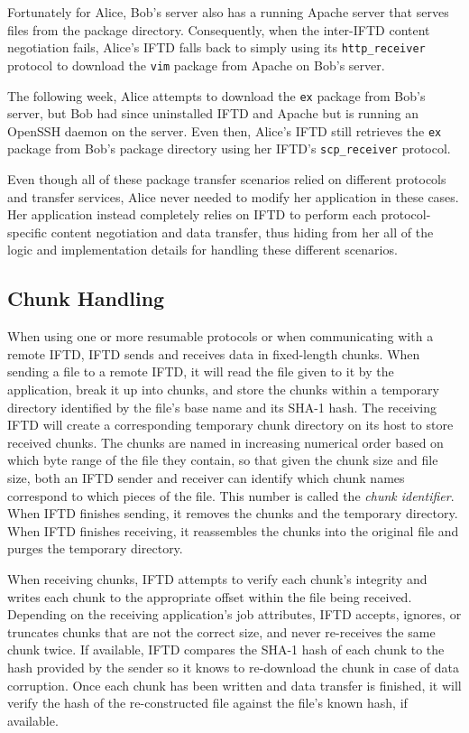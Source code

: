 Fortunately for Alice, Bob's server also has a running Apache server that serves files from the package directory.  Consequently, when the inter-IFTD content negotiation fails, Alice's IFTD falls back to simply using its \texttt{http\_receiver} protocol to download the \texttt{vim} package from Apache on Bob's server.

The following week, Alice attempts to download the \texttt{ex} package from Bob's server, but Bob had since uninstalled IFTD and Apache but is running an OpenSSH daemon on the server.  Even then, Alice's IFTD still retrieves the \texttt{ex} package from Bob's package directory using her IFTD's \texttt{scp\_receiver} protocol.

Even though all of these package transfer scenarios relied on different protocols and transfer services, Alice never needed to modify her application in these cases.  Her application instead completely relies on IFTD to perform each protocol-specific content negotiation and data transfer, thus hiding from her all of the logic and implementation details for handling these different scenarios.

\subsection{Chunk Handling}

When using one or more resumable protocols or when communicating with a remote IFTD, IFTD sends and receives data in fixed-length chunks.  When sending a file to a remote IFTD, it will read the file given to it by the application, break it up into chunks, and store the chunks within a temporary directory identified by the file's base name and its SHA-1 hash.  The receiving IFTD will create a corresponding temporary chunk directory on its host to store received chunks.  The chunks are named in increasing numerical order based on which byte range of the file they contain, so that given the chunk size and file size, both an IFTD sender and receiver can identify which chunk names correspond to which pieces of the file.  This number is called the \textit{chunk identifier}.  When IFTD finishes sending, it removes the chunks and the temporary directory.  When IFTD finishes receiving, it reassembles the chunks into the original file and purges the temporary directory.

When receiving chunks, IFTD attempts to verify each chunk's integrity and writes each chunk to the appropriate offset within the file being received.  Depending on the receiving application's job attributes, IFTD accepts, ignores, or truncates chunks that are not the correct size, and never re-receives the same chunk twice.  If available, IFTD compares the SHA-1 hash of each chunk to the hash provided by the sender so it knows to re-download the chunk in case of data corruption.  Once each chunk has been written and data transfer is finished, it will verify the hash of the re-constructed file against the file's known hash, if available.

